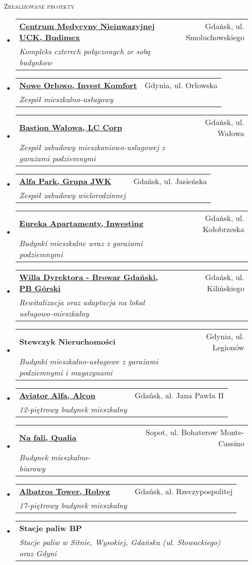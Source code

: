 \documentclass[letterpaper,11pt]{article}
\makeatletter
\newcommand{\resheading}[1]{
  \begin{tcolorbox}
  \textsc{#1}
  \end{tcolorbox}
}
\newcommand{\ressubheading}[4]{
\begin{tabular*}{6.5in}{l@{\extracolsep{\fill}}r}
		\textbf{#1} & #2 \\
		\textit{#3} & \textit{#4} \\
\end{tabular*}\vspace{-6pt}}
\makeatother
\begin{document}
\resheading{Zrealizowane projekty}
\begin{itemize}

\item
  \ressubheading{\href{https://www.urbanity.pl/pomorskie/gdansk/centrum-medycyny-nieinwazyjnej,b4155}{Centrum Medycyny Nieinwazyjnej UCK, Budimex}}{Gdańsk, ul. Smoluchowskiego}{Kompleks czterech połączonych ze sobą budynkow}{}

\item
  \ressubheading{\href{https://www.investkomfort.pl/mieszkania-gdynia/nowe-orlowo/}{Nowe Orłowo, Invest Komfort}}{Gdynia, ul. Orłowska}{Zespół mieszkalno-usługowy}{} 
  
\item
  \ressubheading{\href{https://www.ndi.pl/en/bastion-walowa}{Bastion Wałowa, LC Corp}}{Gdańsk, ul. Wałowa}{Zespół zabudowy mieszkaniowo-uslugowej z garażami podziemnymi}{}

\item
  \ressubheading{\href{https://alfapark.pl}{Alfa Park, Grupa JWK}}{Gdańsk, ul. Jasieńska}{Zespół zabudowy wielorodzinnej}{}

\item
  \ressubheading{\href{http://eurekaapartamenty.pl/}{Eureka Apartamenty, Inwesting}}{Gdańsk, ul. Kołobrzeska}{Budynki mieszkalne wraz z garażami podziemnymi}{}

\item
  \ressubheading{\href{http://www.browargdanski.pl}{Willa Dyrektora - Browar Gdański, PB Górski}}{Gdańsk, ul. Kilińskiego}{Rewitalizacja oraz adaptacja na lokal usługowo-mieszkalny}{}

\item
  \ressubheading{Stewczyk Nieruchomości}{Gdynia, ul. Legionów}{Budynki mieszkalno-usługowe z garażami podziemnymi i magazynami}{}
  
\item
  \ressubheading{\href{https://www.allcon.pl/mieszkania/apartamenty/awiator}{Aviator Alfa, Alcon}}{Gdańsk, al. Jana Pawła II}{12-piętrowy budynek mieszkalny}{}

\item
  \ressubheading{\href{https://dom.trojmiasto.pl/Na-Fali-i310.html}{Na fali, Qualia}}{Sopot, ul. Bohaterow Monte-Cassino}{Budynek mieszkalno-biurowy}{}

\item
  \ressubheading{\href{https://www.gdansk.robyg.pl/oferta/mieszkania/albatross-towers}{Albatros Tower, Robyg}}{Gdańsk, al. Rzeczypospolitej}{17-piętrowy budynek mieszkalny}{}

\item
  \ressubheading{Stacje paliw BP}{}{Stacje paliw w Sitnie, Wysokiej, Gdańsku (ul. Słowackiego) oraz Gdyni}{}

\end{itemize}
\end{document}
